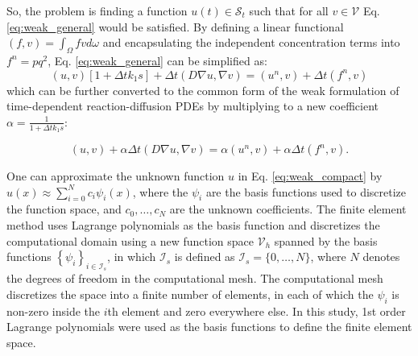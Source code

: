 

So, the problem is finding a function $u(t) \in \mathcal{S}_{t}$ such that for all $v \in \mathcal{V}$ Eq. \ref{eq:weak_general} would be satisfied. By defining a linear functional $(f, v) =\int_{\Omega} f v d \omega$ and encapsulating the independent concentration terms into $f^{n} = pq^2$, Eq. \ref{eq:weak_general} can be simplified as:
\begin{equation}
(u, v)[1+\Delta t k_1 s]+\Delta t(D \nabla u, \nabla v)=\left(u^{n}, v\right)+\Delta t\left(f^{n}, v\right)
\end{equation}
\noindent which can be further converted to the common form of the weak formulation of time-dependent reaction-diffusion \gls{PDE}s by multiplying to a new coefficient $\alpha = \frac{1}{1+\Delta t k_1 s}$:

\begin{equation} \label{eq:weak_compact}
(u, v)+ \alpha \Delta t(D \nabla u, \nabla v)=\alpha \left(u^{n}, v\right)+ \alpha \Delta t\left(f^{n}, v\right).
\end{equation}

One can approximate the unknown function $u$ in Eq. \ref{eq:weak_compact} by $u(x) \approx \sum_{i=0}^{N} c_{i} \psi_{i}(x)$, where the $\psi_{i}$ are the basis functions used to discretize the function space, and $c_0,\ldots,c_N$ are the unknown coefficients. The finite element method uses Lagrange polynomials as the basis function and discretizes the computational domain using a new function space $\mathcal{V}_h$ spanned by the basis functions $\left\{\psi_{i}\right\}_{i \in \mathcal{I}_{s}}$, in which $\mathcal{I}_{s}$ is defined as $\mathcal{I}_{s}=\{0, \ldots, N\}$, where $N$ denotes the degrees of freedom in the computational mesh. The computational mesh discretizes the space into a finite number of elements, in each of which the $\psi_{i}$ is non-zero inside the $i$th element and zero everywhere else. In this study, 1st order Lagrange polynomials were used as the basis functions to define the finite element space.

